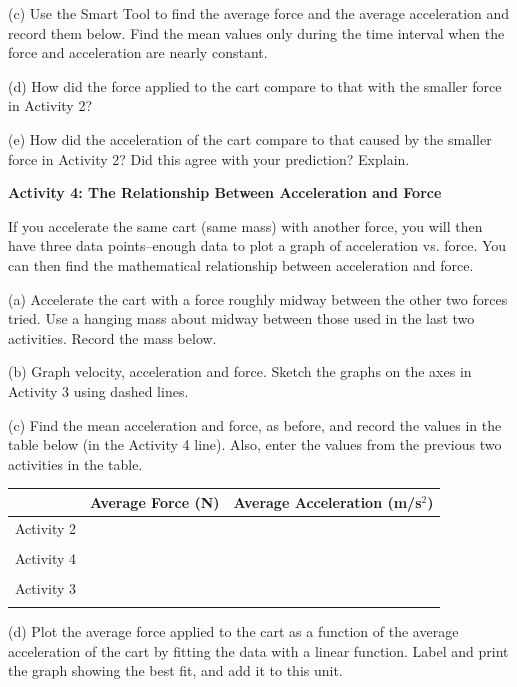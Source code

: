 (c) Use the Smart Tool to find the average force and the average acceleration
and record them below. Find the mean values only during the time interval when
the force and acceleration are nearly constant.
\vspace{20mm}

(d) How did the force applied to the cart compare to that with the smaller force
in Activity 2?
\vspace{20mm}

(e) How did the acceleration of the cart compare to that caused by the smaller
force in Activity 2? Did this agree with your prediction? Explain.
\vspace{20mm}

\textbf{Activity 4: The Relationship Between Acceleration and Force }

If you accelerate the same cart (same mass) with another force, you will then
have three data points--enough data to plot a graph of acceleration vs. force.
You can then find the mathematical relationship between acceleration and force. 

(a) Accelerate the cart with a force roughly midway between the other two forces
tried. Use a hanging mass about midway between those used in the last two activities.
Record the mass below.
\vspace{10mm}

(b) Graph velocity, acceleration and force. Sketch the graphs on the axes in
Activity 3 using dashed lines.

(c) Find the mean acceleration and force, as before, and record the values in
the table below (in the Activity 4 line). Also, enter the values from the previous two activities in the table.

\vspace{0.3cm}
{\centering \begin{tabular}{|c|c|c|}
\hline 
&
Average Force (N)&
Average Acceleration (m/s\( ^{2} \))\\
\hline 
Activity 2&
&
\\
&
&
\\
\hline 
Activity 4&
&
\\
&
&
\\
\hline 
Activity 3&
&
\\
&
&
\\
\hline 
\end{tabular}\par}
\vspace{0.3cm}

(d) Plot the average force applied to the cart as a function of the average acceleration of the cart by fitting the data with a linear function. Label and print the graph showing the best fit, and add it to this unit.

